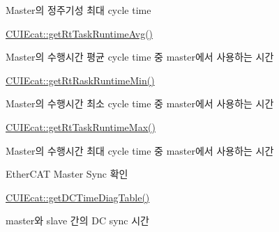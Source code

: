 \begin{DoxyEnumerate}
\begin{DoxyItemize}
\begin{DoxyItemize}
\item Master의 정주기성 최대 cycle time
\end{DoxyItemize}
\item \hyperlink{classCUIEcat_adeb5b823fd182c274bcac03a9cfae560}{C\-U\-I\-Ecat\-::get\-Rt\-Task\-Runtime\-Avg()}
\begin{DoxyItemize}
\item Master의 수행시간 평균 cycle time 중 master에서 사용하는 시간
\end{DoxyItemize}
\item \hyperlink{classCUIEcat_a563eabb48053cfa9ec88213b96914179}{C\-U\-I\-Ecat\-::get\-Rt\-Rask\-Runtime\-Min()}
\begin{DoxyItemize}
\item Master의 수행시간 최소 cycle time 중 master에서 사용하는 시간
\end{DoxyItemize}
\item \hyperlink{classCUIEcat_a49de2bbe30a82bd57c5c3ce86234fece}{C\-U\-I\-Ecat\-::get\-Rt\-Task\-Runtime\-Max()}
\begin{DoxyItemize}
\item Master의 수행시간 최대 cycle time 중 master에서 사용하는 시간
\end{DoxyItemize}
\end{DoxyItemize}
\item Ether\-C\-A\-T Master Sync 확인
\begin{DoxyItemize}
\item \hyperlink{classCUIEcat_aa3925bea5f3005eb3148258af76bbb56}{C\-U\-I\-Ecat\-::get\-D\-C\-Time\-Diag\-Table()}
\begin{DoxyItemize}
\item master와 slave 간의 D\-C sync 시간 
\end{DoxyItemize}
\end{DoxyItemize}
\end{DoxyEnumerate}